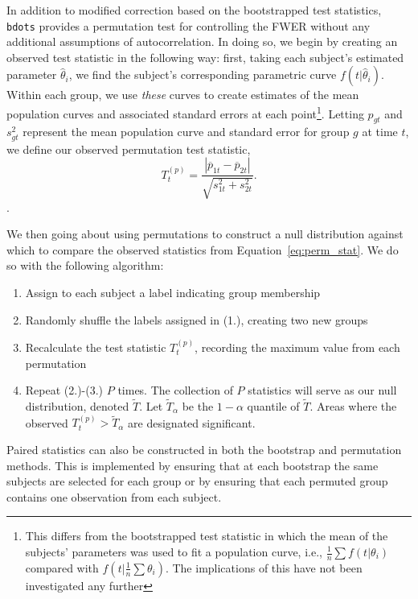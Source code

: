 \documentclass{article}
\newcommand{\xt}{\texttt}%
\begin{document}
In addition to modified correction based on the bootstrapped test statistics, \xt{bdots} provides a permutation test for controlling the FWER without any additional assumptions of autocorrelation. In doing so, we begin by creating an observed test statistic in the following way: first, taking each subject's estimated parameter $\hat{\theta}_i$, we find the subject's corresponding parametric curve $f(t|\hat{\theta}_i)$. Within each group, we use \textit{these} curves to create estimates of the mean population curves and associated standard errors at each point\footnote{This differs from the bootstrapped test statistic in which the mean of the subjects' parameters was used to fit a population curve, i.e., $\frac1n \sum f(t|\theta_i)$ compared with $f \left( t | \frac1n \sum \theta_i \right)$. The implications of this have not been investigated any further}. Letting $p_{gt}$ and $s_{gt}^2$ represent the mean population curve and standard error for group $g$ at time $t$, we define our observed permutation test statistic, 
\begin{equation}\label{eq:perm_stat}
T_t^{(p)} = \frac{|\overline{p}_{1t} - \overline{p}_{2t}|}{\sqrt{s_{1t}^2 + s_{2t}^2}}.
\end{equation}.

We then going about using permutations to construct a null distribution against which to compare the observed statistics from Equation~\ref{eq:perm_stat}. We do so with the following algorithm:

\begin{enumerate}
\item Assign to each subject a label indicating group membership
\item Randomly shuffle the labels assigned in (1.), creating two new groups 
\item Recalculate the test statistic $T^{(p)}_t$, recording the maximum value from each permutation
\item Repeat (2.)-(3.) $P$ times. The collection of $P$ statistics will serve as our null distribution, denoted $\widetilde{T}$. Let $\widetilde{T}_{\alpha}$ be the $1 - \alpha$ quantile of $\widetilde{T}$. Areas where the observed $T^{(p)}_t > \widetilde{T}_{\alpha}$ are designated significant.
\end{enumerate}

Paired statistics can also be constructed in both the bootstrap and permutation methods. This is implemented by ensuring that at each bootstrap the same subjects are selected for each group or by ensuring that each permuted group contains one observation from each subject.
\end{document}
